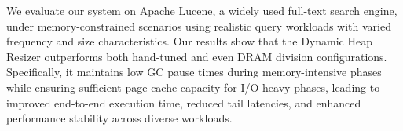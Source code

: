We evaluate our system on Apache Lucene, a widely used full-text search engine, under memory-constrained scenarios using 
realistic query workloads with varied frequency and size characteristics. Our results show that the Dynamic Heap Resizer 
outperforms both hand-tuned and even DRAM division configurations. Specifically, it maintains low GC pause times during 
memory-intensive phases while ensuring sufficient page cache capacity for I/O-heavy phases, leading to improved end-to-end 
execution time, reduced tail latencies, and enhanced performance stability across diverse workloads.
